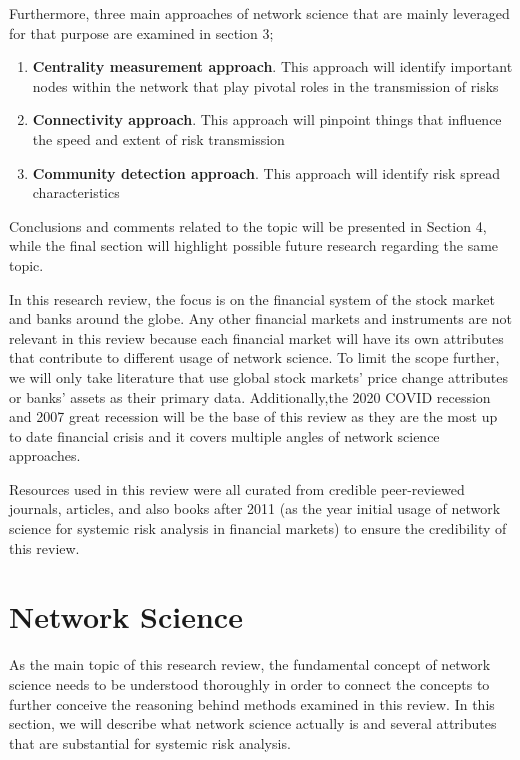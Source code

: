 \documentclass[a4paper,11pt]{article}
\begin{document}
Furthermore, three main approaches of network science that are mainly leveraged for that purpose are examined in section 3; 
\begin{enumerate}
        \item \textbf{Centrality measurement approach}. This approach will identify important nodes within the network that play pivotal roles in the transmission of risks
        \item \textbf{Connectivity approach}. This approach will pinpoint things that influence the speed and extent of risk transmission
        \item \textbf{Community detection approach}. This approach will identify risk spread characteristics
\end{enumerate}
Conclusions and comments related to the topic will be presented in Section 4, while the final section will highlight possible future research regarding the same topic.

In this research review, the focus is on the financial system of the stock market and banks around the globe. Any other financial markets and instruments are not relevant in this review because each financial market will have its own attributes that contribute to different usage of network science. To limit the scope further, we will only take literature that use global stock markets’ price change attributes or banks’ assets as their primary data. Additionally,the 2020 COVID recession and 2007 great recession will be the base of this review as they are the most up to date financial crisis and it covers multiple angles of network science approaches.

Resources used in this review were all curated from credible peer-reviewed journals, articles, and also books after 2011 (as the year initial usage of network science for systemic risk analysis in financial markets) to ensure the credibility of this review.

\section{Network Science}
As the main topic of this research review, the fundamental concept of network science needs to be understood thoroughly in order to connect the concepts to further conceive the reasoning behind methods examined in this review. In this section, we will describe what network science actually is and several attributes that are substantial for systemic risk analysis.
\end{document}
